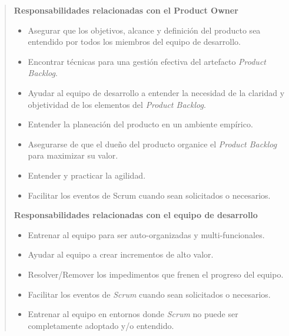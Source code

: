     \begin{quote}
        {\bf Responsabilidades relacionadas con el Product Owner }
        \begin{itemize}
        \item Asegurar que los objetivos, alcance y definición del producto sea
              entendido por todos los miembros del equipo de desarrollo.

        \item Encontrar técnicas para una gestión efectiva del artefacto
              {\it Product Backlog}.

        \item Ayudar al equipo de desarrollo a entender la necesidad de la claridad
              y objetividad de los elementos del {\it Product Backlog}.

        \item Entender la planeación del producto en un ambiente empírico.

        \item Asegurarse de que el dueño del producto organice el {\it Product
              Backlog} para maximizar su valor.

        \item Entender y practicar la agilidad.

        \item Facilitar los eventos de Scrum cuando sean solicitados o necesarios.\\
        \end{itemize}


        {\bf Responsabilidades relacionadas con el equipo de desarrollo}
        \begin{itemize}
        \item Entrenar al equipo para ser auto-organizadas y multi-funcionales.

        \item Ayudar al equipo a crear incrementos de alto valor.

        \item Resolver/Remover los impedimentos que frenen el progreso del equipo.

        \item Facilitar los eventos de {\it Scrum} cuando sean solicitados o necesarios.

        \item Entrenar al equipo en entornos donde {\it Scrum} no puede ser completamente
                adoptado y/o entendido.\\
        \end{itemize}


\end{quote}
